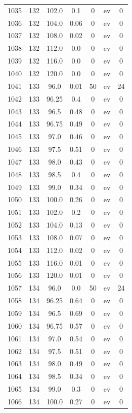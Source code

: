 \documentclass[12pt,a4paper]{article}
\begin{document}
\begin{tabular}{r|cccccc}
	1035 & 132 & 102.0 & 0.1 & 0 & ev & 0 \\
	1036 & 132 & 104.0 & 0.06 & 0 & ev & 0 \\
	1037 & 132 & 108.0 & 0.02 & 0 & ev & 0 \\
	1038 & 132 & 112.0 & 0.0 & 0 & ev & 0 \\
	1039 & 132 & 116.0 & 0.0 & 0 & ev & 0 \\
	1040 & 132 & 120.0 & 0.0 & 0 & ev & 0 \\
	1041 & 133 & 96.0 & 0.01 & 50 & ev & 24 \\
	1042 & 133 & 96.25 & 0.4 & 0 & ev & 0 \\
	1043 & 133 & 96.5 & 0.48 & 0 & ev & 0 \\
	1044 & 133 & 96.75 & 0.49 & 0 & ev & 0 \\
	1045 & 133 & 97.0 & 0.46 & 0 & ev & 0 \\
	1046 & 133 & 97.5 & 0.51 & 0 & ev & 0 \\
	1047 & 133 & 98.0 & 0.43 & 0 & ev & 0 \\
	1048 & 133 & 98.5 & 0.4 & 0 & ev & 0 \\
	1049 & 133 & 99.0 & 0.34 & 0 & ev & 0 \\
	1050 & 133 & 100.0 & 0.26 & 0 & ev & 0 \\
	1051 & 133 & 102.0 & 0.2 & 0 & ev & 0 \\
	1052 & 133 & 104.0 & 0.13 & 0 & ev & 0 \\
	1053 & 133 & 108.0 & 0.07 & 0 & ev & 0 \\
	1054 & 133 & 112.0 & 0.02 & 0 & ev & 0 \\
	1055 & 133 & 116.0 & 0.01 & 0 & ev & 0 \\
	1056 & 133 & 120.0 & 0.01 & 0 & ev & 0 \\
	1057 & 134 & 96.0 & 0.0 & 50 & ev & 24 \\
	1058 & 134 & 96.25 & 0.64 & 0 & ev & 0 \\
	1059 & 134 & 96.5 & 0.69 & 0 & ev & 0 \\
	1060 & 134 & 96.75 & 0.57 & 0 & ev & 0 \\
	1061 & 134 & 97.0 & 0.54 & 0 & ev & 0 \\
	1062 & 134 & 97.5 & 0.51 & 0 & ev & 0 \\
	1063 & 134 & 98.0 & 0.49 & 0 & ev & 0 \\
	1064 & 134 & 98.5 & 0.34 & 0 & ev & 0 \\
	1065 & 134 & 99.0 & 0.3 & 0 & ev & 0 \\
	1066 & 134 & 100.0 & 0.27 & 0 & ev & 0 \\

\end{tabular}
\end{document}
